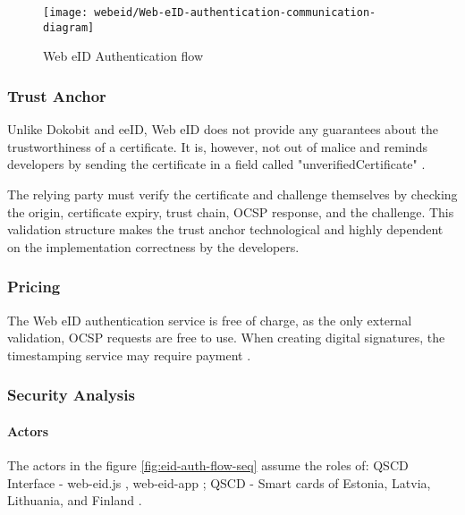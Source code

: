 \begin{figure}
  \centering
  \texttt{[image: webeid/Web-eID-authentication-communication-diagram]}
  \caption{Web eID Authentication flow \cite{ria-webeid-systemarchitecture}}
  \label{fig:web-eid-authentication}
\end{figure}

\subsubsection{Trust Anchor}

Unlike Dokobit and eeID, Web eID does not provide any guarantees about the trustworthiness of a certificate. It is, however, not out of malice and reminds developers by sending the certificate in a field called "unverifiedCertificate" \cite{ria-webeid-source-web-eid-authtoken-validation-java-readme}.

The relying party must verify the certificate and challenge themselves by checking the origin, certificate expiry, trust chain, OCSP response, and the challenge. This validation structure makes the trust anchor technological and highly dependent on the implementation correctness by the developers.


\subsubsection{Pricing}

The Web eID authentication service is free of charge, as the only external validation, OCSP \cite{rfc6960} requests are free to use. When creating digital signatures, the timestamping service may require payment \cite{ria-webeid-source-web-eid-authtoken-validation-java-readme}.

\subsubsection{Security Analysis}

\paragraph{Actors}

The actors in the figure \ref{fig:eid-auth-flow-seq} assume the roles of: QSCD Interface - web-eid.js \cite{ria-webeid-source-web-eid-js}, web-eid-app \cite{ria-webeid-source-web-eid-app}; QSCD - Smart cards of Estonia, Latvia, Lithuania, and Finland \cite{ria-webeid}.

